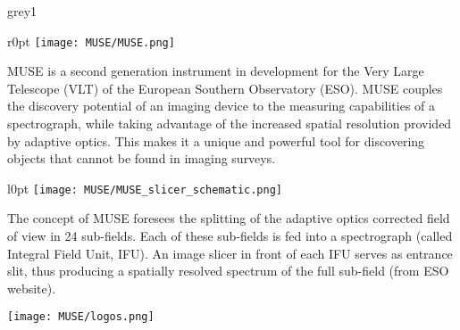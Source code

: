\begin{gbox}{}{grey1}{}
  \begin{minipage}{\linewidth}
    \begin{wrapfigure}{r}{0pt}
      \texttt{[image: MUSE/MUSE.png]}
    \end{wrapfigure}
    \strut {\small MUSE is a second
      generation instrument in development for the Very Large Telescope (VLT) of
      the European Southern Observatory (ESO). MUSE couples the
      discovery potential of an imaging device to the measuring capabilities of
      a spectrograph, while taking advantage of the increased spatial resolution
      provided by adaptive optics. This makes it a unique and powerful tool for
      discovering objects that cannot be found in imaging surveys.}
  \end{minipage}

  \begin{minipage}{\linewidth}
    \begin{wrapfigure}{l}{0pt}
      \texttt{[image: MUSE/MUSE\_slicer\_schematic.png]}
    \end{wrapfigure}
    \strut {\small The concept of MUSE foresees the splitting of the adaptive
      optics corrected field of view in 24 sub-fields. Each of these sub-fields
      is fed into a spectrograph (called Integral Field Unit, IFU). An image
      slicer in front of each IFU serves as entrance slit, thus producing a
      spatially resolved spectrum of the full sub-field (from ESO
      website).}
  \end{minipage}

  \vspace{2cm}

  \begin{minipage}{\linewidth}
    \begin{center}
      \texttt{[image: MUSE/logos.png]}
    \end{center}
  \end{minipage}
\end{gbox}